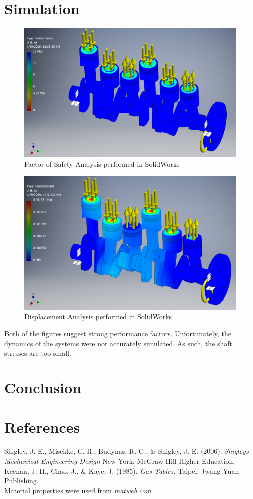 \documentclass[10pt,a4paper]{article}
\begin{document}
\section*{Simulation}
\begin{figure}[h]
		\centering
		\includegraphics[width=\textwidth]{h.png}
		\caption{Factor of Safety Analysis performed in SolidWorks}
		\label{fig:diagram3}
	\end{figure}
	\begin{figure}[h]
		\centering
		\includegraphics[width=\textwidth]{Displacement.png}
		\caption{Displacement Analysis performed in SolidWorks}
		\label{fig:diagram4}
	\end{figure}
Both of the figures suggest strong performance factors. Unfortunately, the dynamics of the systems were not accurately simulated. As such, the shaft stresses are too small.
\newpage
\section*{Conclusion}

\newpage
\section*{References}
Shigley, J. E., Mischke, C. R., Budynas, R. G., \& Shigley, J. E. (2006). \textit{Shigleys Mechanical Engineering Design} New York: McGraw-Hill Higher Education. \\
Keenan, J. H., Chao, J., \& Kaye, J. (1985). \textit{Gas Tables.} Taipei: Jwang Yuan Publishing.\\
Material properties were used from \textit{matweb.com}
\end{document}
